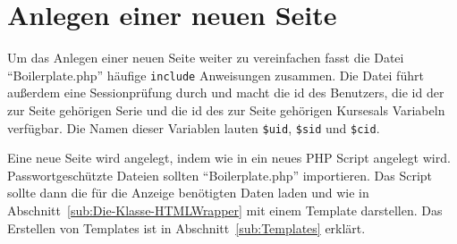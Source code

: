 \section{Anlegen einer neuen Seite}
\label{sec:Anlegen_einer_neuen_Seite}

Um das Anlegen einer neuen Seite weiter zu vereinfachen fasst die Datei
``Boilerplate.php'' häufige \texttt{include} Anweisungen zusammen. Die Datei
führt außerdem eine Sessionprüfung durch und macht die id des Benutzers, die id
der zur Seite gehörigen Serie und die id des zur Seite gehörigen Kursesals
Variabeln verfügbar. Die Namen dieser Variablen lauten \texttt{\$uid},
\texttt{\$sid} und \texttt{\$cid}.

Eine neue Seite wird angelegt, indem wie in ein neues PHP Script angelegt wird.
Passwortgeschützte Dateien sollten ``Boilerplate.php'' importieren. Das Script
sollte dann die für die Anzeige benötigten Daten laden und wie in
Abschnitt~\ref{sub:Die-Klasse-HTMLWrapper} mit einem Template darstellen. Das
Erstellen von Templates ist in Abschnitt~\ref{sub:Templates} erklärt.

